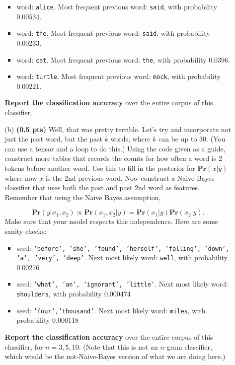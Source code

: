 \documentclass{article}
\newcommand{\pr}{\mathbf{Pr}}
\newcommand{\showpoints}[1]{\textbf{(#1)}}
\begin{document}
\begin{enumerate}
\begin{itemize}
\begin{itemize}
\item 
word: \texttt{alice}. Most frequent previous word: \texttt{said}, with probability $0.00534$.

\item 
word: \texttt{the}. Most frequent previous word: \texttt{said}, with probability $0.00233$.

\item 
word: \texttt{cat}. Most frequent previous word: \texttt{the}, with probability $0.0396$.


\item 
word: \texttt{turtle}. Most frequent previous word: \texttt{mock}, with probability $0.00221$.


\end{itemize}

 \textbf{Report the classification accuracy} over the entire corpus of this classifier.


\item[(b)] \showpoints{0.5 pts}   Well, that was pretty terrible. Let's try and incorporate not just the past word, but the past $k$ words, where $k$ can be up to 30. (You can use a tensor and a loop to do this.) Using the code given as a guide, construct more tables that records the counts for how often a word is 2 tokens before another word. Use this to fill in the posterior for $\pr(x|y)$ where now $x$ is the 2nd previous word. 
 Now construct a Naive Bayes classifier that uses both the past and past 2nd word as features. Remember that using the Naive Bayes assumption,
 
\[
\pr(y|x_1,x_2) \propto \pr(x_1,x_2|y) = \pr(x_1|y)\pr(x_2|y). 
\] 
Make sure that your model respects this independence.
Here are some sanity checks:
\begin{itemize}
\item seed: \texttt{'before', 'she', 'found', 'herself', 'falling', 'down', 'a', 'very', 'deep'}.  Next most likely word: \texttt{well}, with probability 0.00276

\item seed: \texttt{'what', 'an', 'ignorant', 'little'}.  Next most likely word: \texttt{shoulders}, with probability 0.000474

\item seed: \texttt{'four','thousand'}. Next most likely word: \texttt{miles}, with probability 0.000118
\end{itemize}
  
  \textbf{Report the classification accuracy} over the entire corpus of this classifier, for $n = 3, 5, 10$. (Note that this is not an $n$-gram classifier, which would be the not-Naive-Bayes version of what we are doing here.)




\end{itemize}
\end{enumerate}
\end{document}
